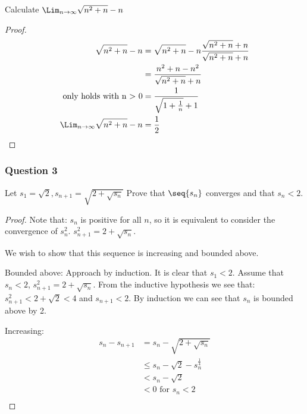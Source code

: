 \documentclass[12pt, letterpaper]{paper}
\begin{document}
\begin{question}
  Calculate $\Lim_{n\to\infty} \sqrt{ n^2 + n} - n$
\end{question}
\begin{proof}
  \begin{align*}
    \sqrt{ n^2 + n} - n          &= \sqrt{ n^2 + n} - n \frac{\sqrt{ n^2 + n}
                                   +n}{\sqrt{n^2 + n} + n}\\
                                 &= \frac{n^2 + n - n^2}{\sqrt{ n^2 + n} + n}\\
    \text{only holds with n > 0} &= \frac{1}{\sqrt{1 + \frac{1}{n}} + 1}\\
    \Lim_{n\to \infty}\sqrt{ n^2 + n}- n &= \frac{1}{2}\\
  \end{align*}
\end{proof}

\subsubsection*{Question 3}

\begin{question}
  Let $s_1 = \sqrt{2}, s_{n+1} = \sqrt{ 2 + \sqrt{s_n}}$ Prove that
  $\seq{s_n}$ converges and that $s_n < 2$.
\end{question}
\begin{proof}
  Note that: $s_n$ is positive for all $n$, so it is equivalent to
  consider the convergence of $s_n^2$. $s_{n+1}^2 = 2 + \sqrt{s_n}$.

  We wish to show that this sequence is increasing and bounded above.

  Bounded above: Approach by induction. It is clear that $s_1 <
  2$. Assume that $s_n < 2$, $s_{n+1}^2 = 2 + \sqrt{s_n}$. From the
  inductive hypothesis we see that: $s_{n+1}^2 < 2 +\sqrt{2} < 4$ and
  $s_{n+1} < 2$. By induction we can see that $s_n$ is bounded above
  by 2.

  Increasing:
  \begin{align*}
    s_n - s_{n+1} &= s_n - \sqrt{ 2 + \sqrt{s_n}}\\
                  &\leq s_n - \sqrt{2} - s_n^{\frac{1}{4}}\\
                  &< s_n - \sqrt{2}\\
                  &< 0 \text{ for } s_n < 2\\    
  \end{align*}  
\end{proof}
\end{document}
